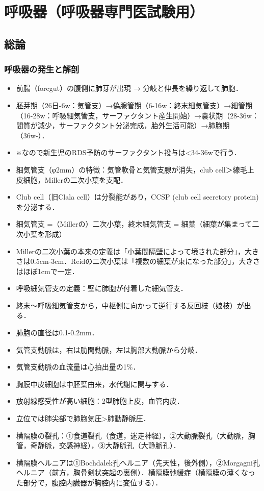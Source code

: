 

\section{呼吸器（呼吸器専門医試験用）}

\subsection{総論}

\subsubsection{呼吸器の発生と解剖}

\begin{itemize}
\item 前腸（foregut）の腹側に肺芽が出現 → 分岐と伸長を繰り返して肺胞．
\item 胚芽期（26日-6w：気管支）→偽腺管期（6-16w：終末細気管支）→細管期（16-28w：呼吸細気管支，サーファクタント産生開始）→嚢状期（28-36w：間質が減少，サーファクタント分泌完成，胎外生活可能）→肺胞期（36w-）．
\item ※なので新生児のRDS予防のサーファクタント投与は<34-36wで行う．
\item 細気管支（φ2mm）の特徴：気管軟骨と気管支腺が消失，club cell＞線毛上皮細胞，Millerの二次小葉を支配．
\item Club cell（旧Clala cell）は分裂能があり，CCSP (club cell secretory protein)を分泌する．
\item 細気管支 =（Millerの）二次小葉，終末細気管支 = 細葉（細葉が集まって二次小葉を形成）
\item Millerの二次小葉の本来の定義は「小葉間隔壁によって境された部分」，大きさは0.5cm-3cm．Reidの二次小葉は「複数の細葉が束になった部分」，大きさはほぼ1cmで一定．
\item 呼吸細気管支の定義：壁に肺胞が付着した細気管支．
\item 終末〜呼吸細気管支から，中枢側に向かって逆行する反回枝（娘枝）が出る．
\item 肺胞の直径は0.1-0.2mm．
\item 気管支動脈は，右は肋間動脈，左は胸部大動脈から分岐．
\item 気管支動脈の血流量は心拍出量の1\%．
\item 胸膜中皮細胞は中胚葉由来，水代謝に関与する．
\item 放射線感受性が高い細胞：2型肺胞上皮，血管内皮．
\item 立位では肺尖部で肺胞気圧>肺動静脈圧．
\item 横隔膜の裂孔：①食道裂孔（食道，迷走神経），②大動脈裂孔（大動脈，胸管，奇静脈，交感神経），③大静脈孔（大静脈孔）．
\item 横隔膜ヘルニアは①Bochdalek孔ヘルニア（先天性，後外側），②Morgagni孔ヘルニア（前方，胸骨剣状突起の裏側）．横隔膜弛緩症（横隔膜の薄くなった部分で，腹腔内臓器が胸腔内に変位する）．


\end{itemize}


